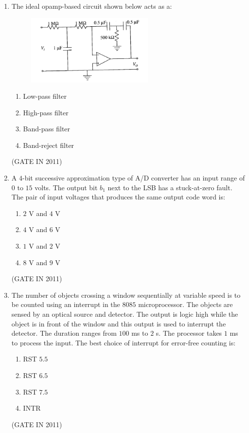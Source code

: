 \documentclass[journal]{IEEEtran}
\begin{document}
\begin{enumerate}
\item The ideal opamp-based circuit shown below acts as a:
\begin{figure}[H]
    \centering
      \includegraphics[width=0.6\textwidth]{15.png} 
      \caption{}
    \label{fig:fig15} 
\end{figure}
\begin{multicols}{4}
\begin{enumerate}
\item Low-pass filter  
\item High-pass filter  
\item Band-pass filter  
\item Band-reject filter
\end{enumerate}
\end{multicols} \hfill(GATE IN 2011)

\item A $4$-bit successive approximation type of A/D converter has an input range of $0$ to $15$ volts. The output bit $b_1$ next to the LSB has a stuck-at-zero fault. The pair of input voltages that produces the same output code word is:
\begin{multicols}{4}
\begin{enumerate}
\item $2$ V and $4$ V  
\item $4$ V and $6$ V  
\item $1$ V and $2$ V  
\item $8$ V and $9$ V
\end{enumerate}
\end{multicols} \hfill(GATE IN 2011)

\item The number of objects crossing a window sequentially at variable speed is to be counted using an interrupt in the $8085$ microprocessor. The objects are sensed by an optical source and detector. The output is logic high while the object is in front of the window and this output is used to interrupt the detector. The duration ranges from $100$ ms to $2$ s. The processor takes $1$ ms to process the input. The best choice of interrupt for error-free counting is:
\begin{multicols}{4}
\begin{enumerate}
\item RST $5.5$  
\item RST $6.5$  
\item RST $7.5$  
\item INTR
\end{enumerate}
\end{multicols} \hfill(GATE IN 2011)


\end{enumerate}
\end{document}
